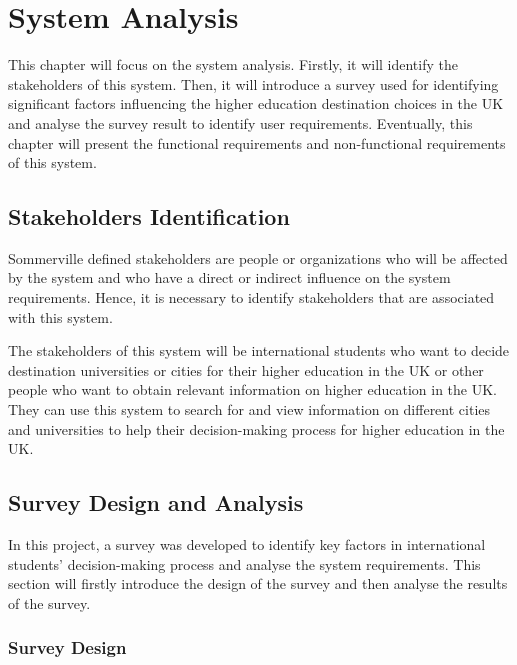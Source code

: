 
\chapter{System Analysis} \label{Chapter:System Analysis}

This chapter will focus on the system analysis. Firstly, it will identify the stakeholders of this system. Then, it will introduce a survey used for identifying significant factors influencing the higher education destination choices in the UK and analyse the survey result to identify user requirements. Eventually, this chapter will present the functional requirements and non-functional requirements of this system.


\section{Stakeholders Identification
}

Sommerville \cite{5_sommerville_2011} defined stakeholders are people or organizations who will be affected by the system and who have a direct or indirect influence on the system requirements. Hence, it is necessary to identify stakeholders that are associated with this system. 

The stakeholders of this system will be international students who want to decide destination universities or cities for their higher education in the UK or other people who want to obtain relevant information on higher education in the UK. They can use this system to search for and view information on different cities and universities to help their decision-making process for higher education in the UK.

\section{Survey Design and Analysis
}
In this project, a survey was developed to identify key factors in international students’ decision-making process and analyse the system requirements. This section will firstly introduce the design of the survey and then analyse the results of the survey.


\subsection{Survey Design
}

